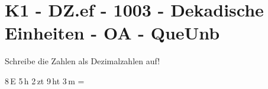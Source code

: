 \section{K1 - DZ.ef - 1003 - Dekadische Einheiten - OA - QueUnb}

\begin{beispiel}{0} %
				Schreibe die Zahlen als Dezimalzahlen auf!\leer
					
					8\,E 5\,h 2\,zt 9\,ht 3\,m = 
\end{beispiel}